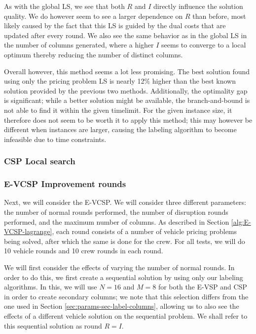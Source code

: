 \documentclass[]{article}
\begin{document}
As with the global LS, we see that both $R$ and $I$ directly influence the solution quality. We do however seem to see a larger dependence on $R$ than before, most likely caused by the fact that this LS is guided by the dual costs that are updated after every round. We also see the same behavior as in the global LS in the number of columns generated, where a higher $I$ seems to converge to a local optimum thereby reducing the number of distinct columns. 

Overall however, this method seems a lot less promising. The best solution found using only the pricing problem LS is nearly 12\% higher than the best known solution provided by the previous two methods. Additionally, the optimality gap is significant; while a better solution might be available, the branch-and-bound is not able to find it within the given timelimit. For the given instance size, it therefore does not seem to be worth it to apply this method; this may however be different when instances are larger, causing the labeling algorithm to become infeasible due to time constraints. 

\subsubsection{CSP Local search}

\subsubsection{E-VCSP Improvement rounds}
Next, we will consider the E-VCSP. We will consider three different parameters: the number of normal rounds performed, the number of disruption rounds performed, and the maximum number of columns. As described in Section \ref{alg:E-VCSP-lagrange}, each round consists of a number of vehicle pricing problems being solved, after which the same is done for the crew. For all tests, we will do 10 vehicle rounds and 10 crew rounds in each round. 

We will first consider the effects of varying the number of normal rounds. In order to do this, we first create a sequential solution by using only our labeling algorithms. In this, we will use $N=16$ and $M=8$ for both the E-VSP and CSP in order to create secondary columns; we note that this selection differs from the one used in Section \ref{sec:params-sec-label-columns}, allowing us to also see the effects of a different vehicle solution on the sequential problem.  We shall refer to this sequential solution as round $R = I$.
\end{document}
